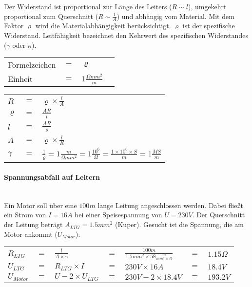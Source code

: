 \noindent Der Widerstand ist proportional zur Länge des Leiters ($R \sim l$), umgekehrt proportional zum Querschnitt ($R \sim \frac{1}{A}$) und abhängig vom Material. Mit dem Faktor $\varrho$ wird die Materialabhängigkeit berücksichtigt. $\varrho$ ist der spezifische Widerstand. Leitfähigkeit bezeichnet den Kehrwert des spezifischen Widerstandes ($\gamma$ oder $\kappa$).\\

\begin{tabular}{llll}
Formelzeichen	& $=$ & $\varrho$ &\\
Einheit			& $=$ & $1\frac{\Omega mm^2}{m	}$ &\\
\end{tabular}\newline

\begin{tabular}{lll}
$R$			& $=$ & $\varrho\times\frac{l}{A}$\\
$\varrho$	& $=$ & $\frac{AR}{l}$\\
$l$			& $=$ & $\frac{AR}{\varrho}$\\
$A$			& $=$ & $\varrho\times\frac{l}{R}$\\
$\gamma$		& $=$ & $\frac{1}{\varrho} = 1\frac{m}{\Omega mm^2} = 1\frac{10^6}{\Omega} = \frac{1\times 10^6\times S}{m} = 1\frac{MS}{m}$
\end{tabular}

		\paragraph{Spannungsabfall auf Leitern}~\\
		
\noindent Ein Motor soll über eine $100m$ lange Leitung angeschlossen werden. Dabei fließt ein Strom von $I = 16A$ bei einer Speisespannung von $U = 230V$. Der Querschnitt der Leitung beträgt $A_{LTG} = 1.5mm^2$ (Kuper). Gesucht ist die Spannung, die am Motor ankommt ($U_{Motor}$).\\

\begin{tabular}{lllllll}
$R_{LTG}$ & $=$ & $\frac{l}{A\times\gamma}$ & $=$ & $\frac{100m}{1.5mm^2\times 58\frac{m}{mm^2\times\Omega}}$ & $=$ & $1.15\Omega$\\
$U_{LTG}$ & $=$ & $R_{LTG}\times I$ & $=$ & $230V \times 16A$ & $=$ & $18.4V$\\
$U_{Motor}$ & $=$ & $U - 2\times U_{LTG}$ & $=$ & $230V - 2\times 18.4V$ & $=$ & $193.2V$ \\
\end{tabular}

